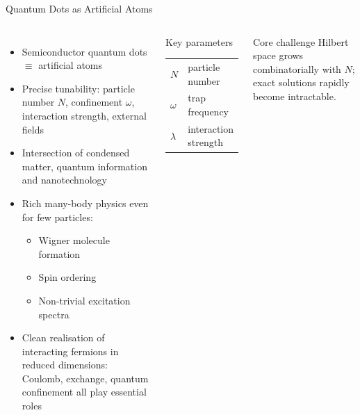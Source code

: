 \documentclass[aspectratio=169,10pt]{beamer}
\begin{document}
\begin{frame}{Quantum Dots as Artificial Atoms}
  \begin{columns}[T]
      \begin{itemize}
        \item Semiconductor quantum dots $\equiv$ \alert{artificial atoms}
        \item Precise tunability: particle number $N$, confinement $\omega$,
              interaction strength, external fields
        \item Intersection of condensed matter, quantum information
              and nanotechnology
        \item Rich many-body physics even for few particles:
          \begin{itemize}
            \item Wigner molecule formation
            \item Spin ordering
            \item Non-trivial excitation spectra
          \end{itemize}
        \item Clean realisation of interacting fermions in reduced dimensions:
              Coulomb, exchange, quantum confinement all play essential roles
      \end{itemize}
      \begin{block}{Key parameters}
        \begin{tabular}{ll}
          $N$       & particle number \\
          $\omega$  & trap frequency  \\
          $\lambda$ & interaction strength
        \end{tabular}
      \end{block}
      \vspace{0.4cm}
      \begin{alertblock}{Core challenge}
        Hilbert space grows combinatorially with $N$; exact solutions
        rapidly become intractable.
      \end{alertblock}
  \end{columns}
\end{frame}
\end{document}
